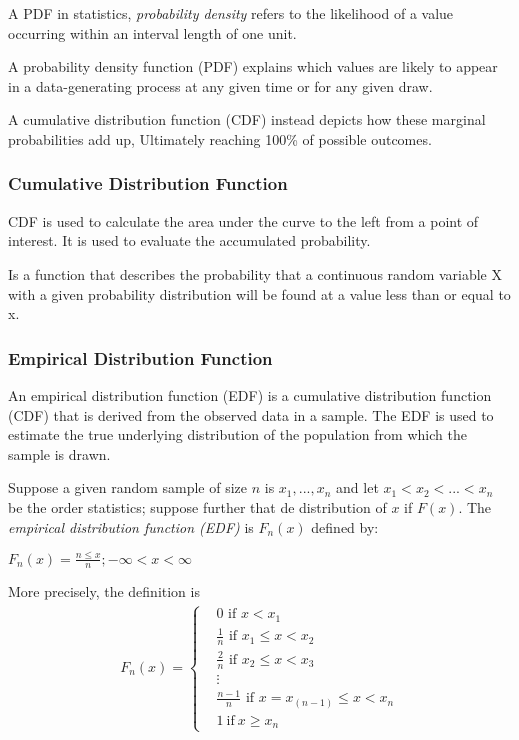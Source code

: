 \documentclass[11pt]{article}
\begin{document}
A PDF in statistics, \emph{probability density} refers to the likelihood
of a value occurring within an interval length of one unit.

A probability density function (PDF) explains which values are likely to
appear in a data-generating process at any given time or for any given
draw.

A cumulative distribution function (CDF) instead depicts how these
marginal probabilities add up, Ultimately reaching 100\% of possible
outcomes.

\hypertarget{cumulative-distribution-function}{%
\subsubsection{Cumulative Distribution
Function}\label{cumulative-distribution-function}}

CDF is used to calculate the area under the curve to the left from a
point of interest. It is used to evaluate the accumulated probability.

Is a function that describes the probability that a continuous random
variable X with a given probability distribution will be found at a
value less than or equal to x.

\hypertarget{empirical-distribution-function}{%
\subsubsection{Empirical Distribution
Function}\label{empirical-distribution-function}}

An empirical distribution function (EDF) is a cumulative distribution
function (CDF) that is derived from the observed data in a sample. The
EDF is used to estimate the true underlying distribution of the
population from which the sample is drawn.

Suppose a given random sample of size \(n\) is \(x_1, ..., x_n\) and let
\(x_1 < x_2 < ... < x_n\) be the order statistics; suppose further that
de distribution of \(x\) if \(F(x)\). The \emph{empirical distribution
function (EDF)} is \(F_n(x)\) defined by:

\(F_n(x) = \frac{n \leq x}{n}; -\infty < x < \infty\)

More precisely, the definition is
\begin{gather}
  F_n(x) = \begin{cases}  & 0 \text{ if } x < x_1\\  & \frac{1}{n} \text{ if } x_1 \leq x <x_2 \\  & \frac{2}{n} \text{ if } x_2 \leq x < x_3 \\  & \vdots \\  & \frac{n-1}{n}\text{ if } x = x_(n-1) \leq x < x_n \\  & 1 \ \text{if} \ x \geq x_n \end{cases}
\end{gather}
\end{document}
